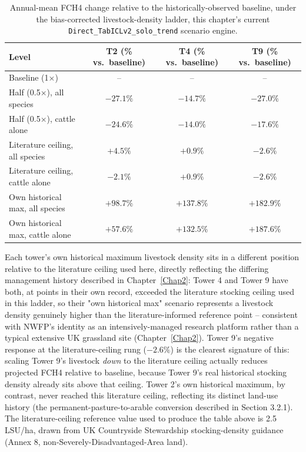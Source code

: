 \begin{table}[h]
\centering
\small
\begin{tabular}{lccc}
\toprule
Level & T2 (\% vs.\ baseline) & T4 (\% vs.\ baseline) & T9 (\% vs.\ baseline) \\
\midrule
Baseline (1$\times$) & -- & -- & -- \\
Half (0.5$\times$), all species & $-27.1\%$ & $-14.7\%$ & $-27.0\%$ \\
Half (0.5$\times$), cattle alone & $-24.6\%$ & $-14.0\%$ & $-17.6\%$ \\
Literature ceiling, all species & $+4.5\%$ & $+0.9\%$ & $-2.6\%$ \\
Literature ceiling, cattle alone & $-2.1\%$ & $+0.9\%$ & $-2.6\%$ \\
Own historical max, all species & $+98.7\%$ & $+137.8\%$ & $+182.9\%$ \\
Own historical max, cattle alone & $+57.6\%$ & $+132.5\%$ & $+187.6\%$ \\
\bottomrule
\end{tabular}
\caption{Annual-mean FCH4 change relative to the historically-observed baseline, under the
bias-corrected livestock-density ladder, this chapter's current
\texttt{Direct\_TabICLv2\_solo\_trend} scenario engine.}
\end{table}

Each tower's own historical maximum livestock density sits in a different position relative to the
literature ceiling used here, directly reflecting the differing management history described in
Chapter~\ref{Chap2}: Tower 4 and Tower 9 have both, at points in their own record, exceeded the
literature stocking ceiling used in this ladder, so their "own historical max" scenario represents a
livestock density genuinely higher than the literature-informed reference point -- consistent with
NWFP's identity as an intensively-managed research platform rather than a typical extensive UK
grassland site (Chapter~\ref{Chap2}). Tower 9's negative response at the literature-ceiling rung
($-2.6\%$) is the clearest signature of this: scaling Tower 9's livestock \emph{down} to the
literature ceiling actually reduces projected FCH4 relative to baseline, because Tower 9's real
historical stocking density already sits above that ceiling. Tower 2's own historical maximum, by
contrast, never reached this literature ceiling, reflecting its distinct land-use history (the
permanent-pasture-to-arable conversion described in Section 3.2.1). The literature-ceiling reference
value used to produce the table above is 2.5 LSU/ha, drawn from UK Countryside Stewardship
stocking-density guidance (Annex 8, non-Severely-Disadvantaged-Area land).

